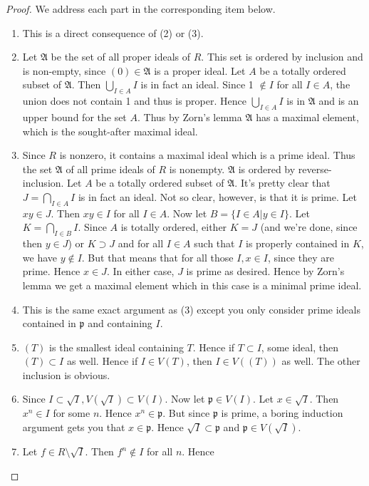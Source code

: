 \begin{proof}
We address each part in the corresponding item below.
\begin{enumerate}
\item This is a direct consequence of (2) or (3).
\item Let $\mathfrak{A}$ be the set of all proper ideals of $R$. This set is
ordered by inclusion and is non-empty, since $(0) \in \mathfrak{A}$ is a proper
ideal. Let $A$ be a totally ordered subset of $\mathfrak A$.
Then $\bigcup_{I \in A} I$ is in
fact an ideal. Since 1 $\notin I$ for all $I \in A$, the union does not contain
1 and thus is proper. Hence $\bigcup_{I \in A} I$ is in $\mathfrak{A}$ and is
an upper bound for the set $A$. Thus by Zorn's lemma $\mathfrak{A}$ has a
maximal element, which is the sought-after maximal ideal.
\item Since $R$ is nonzero, it contains a maximal ideal which is a prime ideal.
Thus the set $\mathfrak{A}$ of all prime ideals of $R$ is nonempty.
$\mathfrak{A}$ is ordered by reverse-inclusion. Let $A$ be a totally ordered
subset of $\mathfrak{A}$. It's pretty clear that $J = \bigcap_{I \in A} I$ is
in fact an ideal. Not so clear, however, is that it is prime. Let $xy \in J$.
Then $xy \in I$ for all $I \in A$. Now let $B = \{I \in A | y \in I\}$. Let $K
= \bigcap_{I \in B} I$. Since $A$ is totally ordered, either $K = J$ (and we're
done, since then $y \in J$) or $K \supset J$ and for all $I \in A$ such that
$I$ is properly contained in $K$, we have $y \notin I$. But that means that for
all those $I, x \in I$, since they are prime. Hence $x \in J$. In either case,
$J$ is prime as desired. Hence by Zorn's lemma we get a maximal element which
in this case is a minimal prime ideal.
\item This is the same exact argument as (3) except you only consider prime
ideals contained in $\mathfrak{p}$ and containing $I$.
\item $(T)$ is the smallest ideal containing $T$. Hence if $T \subset I$, some
ideal, then $(T) \subset I$ as well. Hence if $I \in V(T)$, then $I \in V((T))$
as well. The other inclusion is obvious.
\item Since $I \subset \sqrt{I}, V(\sqrt{I}) \subset V(I)$. Now let
$\mathfrak{p} \in V(I)$. Let $x \in \sqrt{I}$. Then $x^n \in I$ for some $n$.
Hence $x^n \in \mathfrak{p}$. But since $\mathfrak{p}$ is prime, a boring
induction argument gets you that $x \in \mathfrak{p}$. Hence $\sqrt{I} \subset
\mathfrak{p}$ and $\mathfrak{p} \in V(\sqrt{I})$.
\item Let $f \in R \setminus \sqrt{I}$. Then $f^n \notin I$ for all $n$. Hence

\end{enumerate}
\end{proof}
